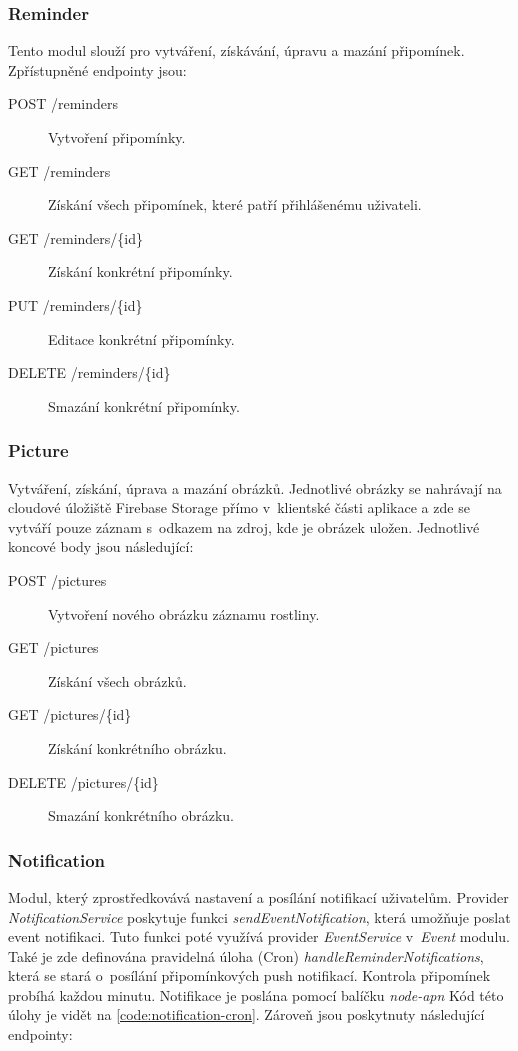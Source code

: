 \documentclass[thesis=M,czech]{FITthesis}[2019/12/23]
\begin{document}
\subsubsection{Reminder}
Tento modul slouží pro vytváření, získávání, úpravu a mazání připomínek. Zpřístupněné endpointy jsou:

\begin{description}
    \item[POST /reminders] Vytvoření připomínky.
    \item[GET /reminders] Získání všech připomínek, které patří přihlášenému uživateli.
    \item[GET /reminders/\{id\}] Získání konkrétní připomínky.
    \item[PUT /reminders/\{id\}] Editace konkrétní připomínky.
    \item[DELETE /reminders/\{id\}] Smazání konkrétní připomínky.
\end{description}

\subsubsection{Picture}
Vytváření, získání, úprava a mazání obrázků. Jednotlivé obrázky se nahrávají na cloudové úložiště Firebase Storage přímo v~klientské části aplikace a zde se vytváří pouze záznam s~odkazem na zdroj, kde je obrázek uložen. Jednotlivé koncové body jsou následující:

\begin{description}
    \item[POST /pictures] Vytvoření nového obrázku záznamu rostliny.
    \item[GET /pictures] Získání všech obrázků.
    \item[GET /pictures/\{id\}] Získání konkrétního obrázku.
    \item[DELETE /pictures/\{id\}] Smazání konkrétního obrázku.
\end{description}

\subsubsection{Notification}
Modul, který zprostředkovává nastavení a posílání notifikací uživatelům. Provider \textit{NotificationService} poskytuje funkci \textit{sendEventNotification}, která umožňuje poslat event notifikaci. Tuto funkci poté využívá provider \textit{EventService} v~\textit{Event} modulu. Také je zde definována pravidelná úloha (Cron) \textit{handleReminderNotifications}, která se stará o~posílání připomínkových push notifikací. Kontrola připomínek probíhá každou minutu. Notifikace je poslána pomocí balíčku \textit{node-apn} Kód této úlohy je vidět na \ref{code:notification-cron}. Zároveň jsou poskytnuty následující endpointy:
\end{document}

